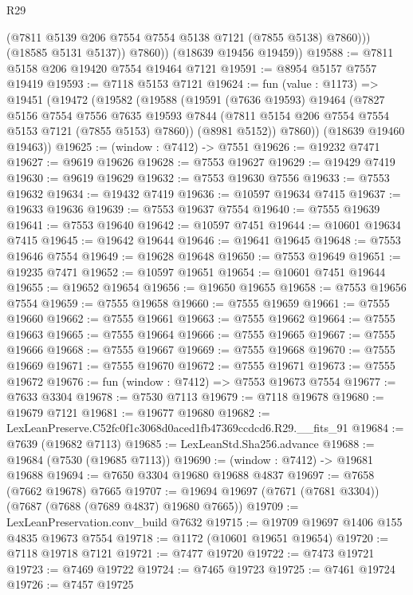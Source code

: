 \begin{lexlean}{R29}
\begin{coremodule}
                (@7811 @5139 @206 @7554 @7554 @5138 @7121 (@7855 @5138) @7860)))
            (@18585 @5131 @5137))
          @7860))
      (@18639 @19456 @19459))
@19588 := @7811 @5158 @206 @19420 @7554 @19464 @7121
@19591 := @8954 @5157 @7557 @19419
@19593 := @7118 @5153 @7121
@19624 := fun (value : @1173) =>
  @19451
    (@19472
      (@19582
        (@19588
          (@19591
            (@7636 @19593)
            @19464
            (@7827
              @5156
              @7554
              @7556
              @7635
              @19593
              @7844
              (@7811 @5154 @206 @7554 @7554 @5153 @7121 (@7855 @5153) @7860))
            (@8981 @5152))
          @7860))
      (@18639 @19460 @19463))
@19625 := (window : @7412) -> @7551
@19626 := @19232 @7471
@19627 := @9619 @19626
@19628 := @7553 @19627
@19629 := @19429 @7419
@19630 := @9619 @19629
@19632 := @7553 @19630 @7556
@19633 := @7553 @19632
@19634 := @19432 @7419
@19636 := @10597 @19634 @7415
@19637 := @19633 @19636
@19639 := @7553 @19637 @7554
@19640 := @7555 @19639
@19641 := @7553 @19640
@19642 := @10597 @7451
@19644 := @10601 @19634 @7415
@19645 := @19642 @19644
@19646 := @19641 @19645
@19648 := @7553 @19646 @7554
@19649 := @19628 @19648
@19650 := @7553 @19649
@19651 := @19235 @7471
@19652 := @10597 @19651
@19654 := @10601 @7451 @19644
@19655 := @19652 @19654
@19656 := @19650 @19655
@19658 := @7553 @19656 @7554
@19659 := @7555 @19658
@19660 := @7555 @19659
@19661 := @7555 @19660
@19662 := @7555 @19661
@19663 := @7555 @19662
@19664 := @7555 @19663
@19665 := @7555 @19664
@19666 := @7555 @19665
@19667 := @7555 @19666
@19668 := @7555 @19667
@19669 := @7555 @19668
@19670 := @7555 @19669
@19671 := @7555 @19670
@19672 := @7555 @19671
@19673 := @7555 @19672
@19676 := fun (window : @7412) => @7553 @19673 @7554
@19677 := @7633 @3304
@19678 := @7530 @7113
@19679 := @7118 @19678
@19680 := @19679 @7121
@19681 := @19677 @19680
@19682 := LexLeanPreserve.C52fc0f1c3068d0aced1fb47369ccdcd6.R29.__fits_91
@19684 := @7639 (@19682 @7113)
@19685 := LexLeanStd.Sha256.advance
@19688 := @19684 (@7530 (@19685 @7113))
@19690 := (window : @7412) -> @19681 @19688
@19694 := @7650 @3304 @19680 @19688 @4837
@19697 := @7658 (@7662 @19678) @7665
@19707 := @19694 @19697 (@7671 (@7681 @3304)) (@7687 (@7688 (@7689 @4837) @19680 @7665))
@19709 := LexLeanPreservation.conv_build @7632
@19715 := @19709 @19697 @1406 @155 @4835 @19673 @7554
@19718 := @1172 (@10601 @19651 @19654)
@19720 := @7118 @19718 @7121
@19721 := @7477 @19720
@19722 := @7473 @19721
@19723 := @7469 @19722
@19724 := @7465 @19723
@19725 := @7461 @19724
@19726 := @7457 @19725

\end{coremodule}
\end{lexlean}
